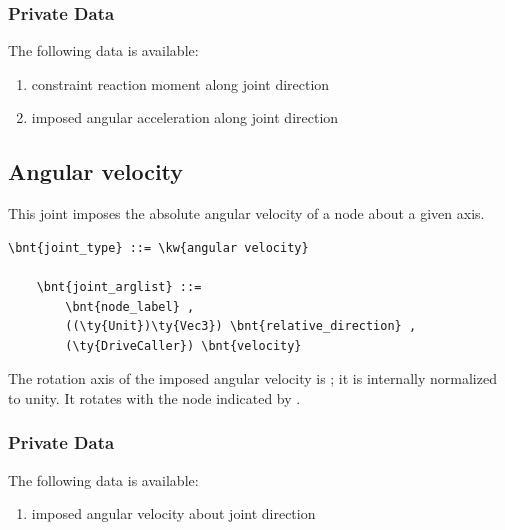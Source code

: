 \subsubsection{Private Data}
The following data is available:
\begin{enumerate}
\item {} constraint reaction moment along joint direction
\item {} imposed angular acceleration along joint direction
\end{enumerate}



\subsection{Angular velocity}
This joint imposes the absolute angular velocity of a node
about a given axis.
\begin{Verbatim}[commandchars=\\\{\}]
    \bnt{joint_type} ::= \kw{angular velocity}

    \bnt{joint_arglist} ::=
        \bnt{node_label} ,
        ((\ty{Unit})\ty{Vec3}) \bnt{relative_direction} , 
        (\ty{DriveCaller}) \bnt{velocity}
\end{Verbatim}
The rotation axis of the imposed angular velocity is ;
it is internally normalized to unity.
It rotates with the node indicated by .

\subsubsection{Private Data}
The following data is available:
\begin{enumerate}
\item {} imposed angular velocity about joint direction
\end{enumerate}



